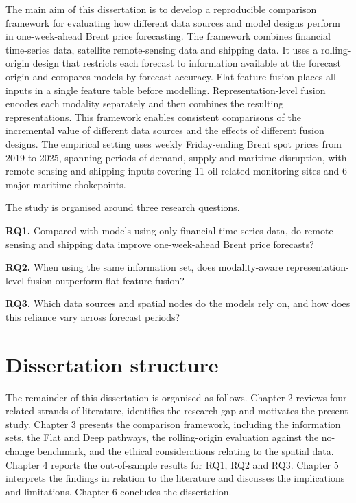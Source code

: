 \documentclass[
  british,
  12pt,
  oneside]{book}
\begin{document}
The main aim of this dissertation is to develop a reproducible comparison framework for evaluating how different data sources and model designs perform in one-week-ahead Brent price forecasting. The framework combines financial time-series data, satellite remote-sensing data and shipping data. It uses a rolling-origin design that restricts each forecast to information available at the forecast origin and compares models by forecast accuracy. Flat feature fusion places all inputs in a single feature table before modelling. Representation-level fusion encodes each modality separately and then combines the resulting representations. This framework enables consistent comparisons of the incremental value of different data sources and the effects of different fusion designs. The empirical setting uses weekly Friday-ending Brent spot prices from 2019 to 2025, spanning periods of demand, supply and maritime disruption, with remote-sensing and shipping inputs covering 11 oil-related monitoring sites and 6 major maritime chokepoints.

The study is organised around three research questions.

\textbf{RQ1.} Compared with models using only financial time-series data, do remote-sensing and shipping data improve one-week-ahead Brent price forecasts?

\textbf{RQ2.} When using the same information set, does modality-aware representation-level fusion outperform flat feature fusion?

\textbf{RQ3.} Which data sources and spatial nodes do the models rely on, and how does this reliance vary across forecast periods?

\section{Dissertation structure}\label{intro-structure}

The remainder of this dissertation is organised as follows. Chapter 2 reviews four related strands of literature, identifies the research gap and motivates the present study. Chapter 3 presents the comparison framework, including the information sets, the Flat and Deep pathways, the rolling-origin evaluation against the no-change benchmark, and the ethical considerations relating to the spatial data. Chapter 4 reports the out-of-sample results for RQ1, RQ2 and RQ3. Chapter 5 interprets the findings in relation to the literature and discusses the implications and limitations. Chapter 6 concludes the dissertation.
\end{document}
